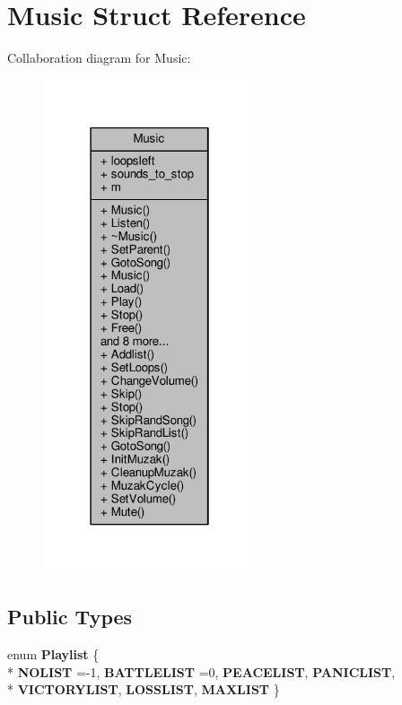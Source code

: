 \hypertarget{classMusic}{}\section{Music Struct Reference}
\label{classMusic}


Collaboration diagram for Music\+:
\nopagebreak
\begin{figure}[H]
\begin{center}
\leavevmode
\includegraphics[width=178pt]{d1/dd9/classMusic__coll__graph}
\end{center}
\end{figure}
\subsection*{Public Types}
\begin{DoxyCompactItemize}
\item 
enum {\bfseries Playlist} \{ \\*
{\bfseries N\+O\+L\+I\+ST} =-\/1, 
{\bfseries B\+A\+T\+T\+L\+E\+L\+I\+ST} =0, 
{\bfseries P\+E\+A\+C\+E\+L\+I\+ST}, 
{\bfseries P\+A\+N\+I\+C\+L\+I\+ST}, 
\\*
{\bfseries V\+I\+C\+T\+O\+R\+Y\+L\+I\+ST}, 
{\bfseries L\+O\+S\+S\+L\+I\+ST}, 
{\bfseries M\+A\+X\+L\+I\+ST}
 \}\hypertarget{classMusic_a4559cbbf65b18a56ed5643ea8110a277}{}\label{classMusic_a4559cbbf65b18a56ed5643ea8110a277}

\end{DoxyCompactItemize}
